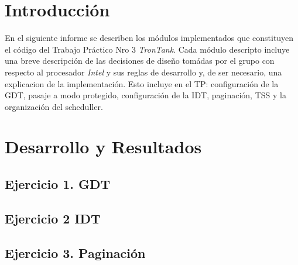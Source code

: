 \documentclass[a4paper,10pt,twoside]{article}
\begin{document}
\newpage




\tableofcontents

\newpage




\section{Introducción}
En el siguiente informe se describen los m\'odulos implementados que constituyen el c\'odigo del Trabajo Pr\'actico Nro 3 
\emph{TronTank}. Cada m\'odulo descripto incluye una breve descripci\'on de las decisiones de diseño tom\'adas por el grupo con 
respecto al procesador \emph{Intel} y sus reglas de desarrollo y, de ser necesario, una explicacion de la implementaci\'on. Esto incluye
en el TP: configuraci\'on de la GDT, pasaje a modo protegido, configuraci\'on de la IDT, paginaci\'on, TSS y la organizaci\'on del 
scheduller. 





\newpage
\section{Desarrollo y Resultados}

\subsection{Ejercicio 1. GDT}


\newpage
\subsection{Ejercicio 2 IDT}


\newpage
\subsection{Ejercicio 3. Paginaci\'on}
\end{document}
